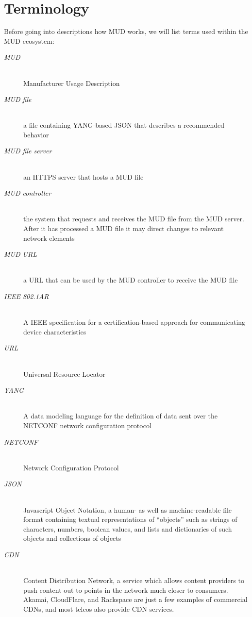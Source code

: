 \documentclass[conference]{IEEEtran}
\begin{document}
\section{Terminology}

Before going into descriptions how MUD works, we will list terms used
within the MUD ecosystem:

\begin{description}
\item[{\color{brown}\it MUD}] \hfill \\ Manufacturer Usage Description
\item[{\color{brown}\it MUD file}] \hfill \\ a file containing YANG-based JSON that
  describes a recommended behavior
\item[{\color{brown}\it MUD file server}] \hfill \\ an HTTPS server that hosts a MUD file
\item[{\color{brown}\it MUD controller}] \hfill \\ the system that requests and
  receives the MUD file from the MUD server.  After it has processed a
  MUD file it may direct changes to relevant network elements
\item[{\color{brown}\it MUD URL}] \hfill \\ a URL that can be used by the MUD
  controller to receive the MUD file
\item[{\color{brown}\it IEEE 802.1AR}] \hfill \\ A IEEE specification for a
  certification-based approach for communicating device
  characteristics
\item[{\color{brown}\it URL}] \hfill \\ Universal Resource Locator
\item[{\color{brown}\it YANG}] \hfill \\ A data modeling language for the
  definition of data sent over the NETCONF network configuration
  protocol\cite{ietf:rfc-yang}
\item[{\color{brown}\it NETCONF}] \hfill \\ Network Configuration
  Protocol\cite{ietf:rfc-netconf}
\item[{\color{brown}\it JSON}] \hfill \\ Javascript Object Notation, a human- as
  well as machine-readable file format containing textual
  representations of ``objects'' such as strings of characters,
  numbers, boolean values, and lists and dictionaries of such objects
  and collections of objects
\item[{\color{brown}\it CDN}] \hfill \\ Content Distribution Network,
  a service which allows content providers to push content out to
  points in the network much closer to consumers.  Akamai, CloudFlare,
  and Rackspace are just a few examples of commercial CDNs, and most
  telcos also provide CDN services.
\end{description}
\end{document}
